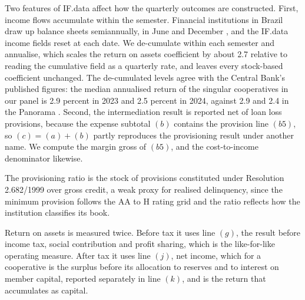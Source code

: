 \documentclass[11pt,a4paper]{article}
\begin{document}
Two features of IF.data affect how the quarterly outcomes are constructed. First, income
flows accumulate within the semester. Financial institutions in Brazil draw up balance
sheets semiannually, in June and December \citep{lei4595}, and the IF.data income fields
reset at each date. We de-cumulate within each semester and
annualise, which scales the return on assets coefficient by about 2.7 relative to
reading the cumulative field as a quarterly rate, and leaves every stock-based
coefficient unchanged. The de-cumulated levels agree with the Central Bank's published
figures: the median annualised return of the singular cooperatives in our panel is 2.9
percent in 2023 and 2.5 percent in 2024, against 2.9 and 2.4 in the Panorama
\citep{bcb2025panorama}. Second, the intermediation result is reported net of
loan loss provisions, because the expense subtotal $(b)$ contains the provision line
$(b5)$, so $(c) = (a) + (b)$ partly reproduces the provisioning result under another name. We compute the
margin gross of $(b5)$, and the cost-to-income denominator likewise.

The provisioning ratio is the stock of provisions constituted under Resolution 2.682/1999
over gross credit, a weak proxy for realised delinquency, since the minimum provision
follows the AA to H rating grid and the ratio reflects how the institution classifies
its book.

Return on assets is measured twice. Before tax it uses line $(g)$, the result before
income tax, social contribution and profit sharing, which is the like-for-like operating
measure. After tax it uses line $(j)$, net income, which for a cooperative is the surplus
before its allocation to reserves and to interest on member capital, reported separately
in line $(k)$, and is the return that accumulates as capital.
\end{document}
